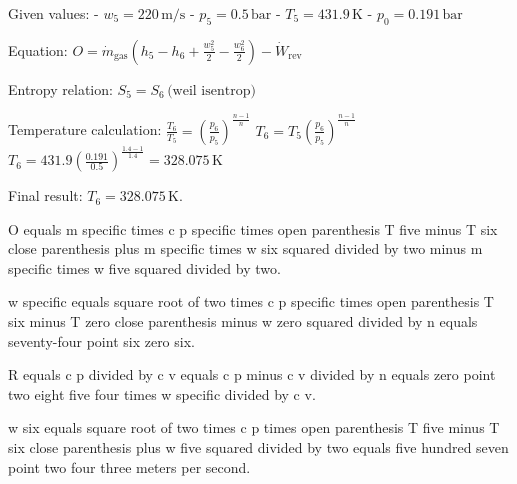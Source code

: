 Given values:  
- \( w_5 = 220 \, \text{m/s} \)  
- \( p_5 = 0.5 \, \text{bar} \)  
- \( T_5 = 431.9 \, \text{K} \)  
- \( p_0 = 0.191 \, \text{bar} \)  

Equation:  
\( O = \dot{m}_{\text{gas}} \left( h_5 - h_6 + \frac{w_5^2}{2} - \frac{w_6^2}{2} \right) - \dot{W}_{\text{rev}} \)  

Entropy relation:  
\( S_5 = S_6 \, \text{(weil isentrop)} \)  

Temperature calculation:  
\( \frac{T_6}{T_5} = \left( \frac{p_6}{p_5} \right)^{\frac{n-1}{n}} \)  
\( T_6 = T_5 \left( \frac{p_6}{p_5} \right)^{\frac{n-1}{n}} \)  
\( T_6 = 431.9 \left( \frac{0.191}{0.5} \right)^{\frac{1.4-1}{1.4}} = 328.075 \, \text{K} \)  

Final result: \( T_6 = 328.075 \, \text{K} \).

O equals m specific times c p specific times open parenthesis T five minus T six close parenthesis plus m specific times w six squared divided by two minus m specific times w five squared divided by two.  

w specific equals square root of two times c p specific times open parenthesis T six minus T zero close parenthesis minus w zero squared divided by n equals seventy-four point six zero six.  

R equals c p divided by c v equals c p minus c v divided by n equals zero point two eight five four times w specific divided by c v.  

w six equals square root of two times c p times open parenthesis T five minus T six close parenthesis plus w five squared divided by two equals five hundred seven point two four three meters per second.